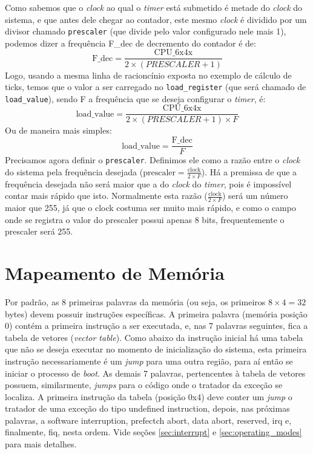 Como sabemos que o \emph{clock} ao qual o \emph{timer} está submetido é metade do \emph{clock} do sistema, e que antes dele chegar ao contador, este mesmo \emph{clock} é dividido por um divisor chamado \verb+prescaler+ (que divide pelo valor configurado nele mais 1), podemos dizer a frequência F\_dec de decremento do contador é de:
\begin{equation}
	\text{F\_dec} = \frac{\text{CPU\_6x4x}}{2 \times (PRESCALER+1)}
\end{equation}
Logo, usando a mesma linha de racioncínio exposta no exemplo de cálculo de ticks, temos que o valor a ser carregado no \verb+load_register+ (que será chamado de \verb+load_value+), sendo F a frequência que se deseja configurar o \emph{timer}, é:
\begin{equation}
	\text{load\_value} = \frac{\text{CPU\_6x4x}}{2 \times (PRESCALER+1) \times F}
\end{equation}
Ou de maneira mais simples:
\begin{equation}
	\text{load\_value} = \frac{\text{F\_dec}}{F}
\end{equation}
Precisamos agora definir o \verb+prescaler+. Definimos ele como a razão entre o \emph{clock} do sistema pela frequência desejada ($\text{prescaler}=\frac{\text{clock}}{2 \times F}$). Há a premissa de que a frequência desejada não será maior que a do \emph{clock} do \emph{timer}, pois é impossível contar mais rápido que isto. Normalmente esta razão ($\frac{\text{clock}}{2 \times F}$) será um número maior que 255, já que o clock costuma ser muito mais rápido, e como o campo onde se registra o valor do prescaler possui apenas 8 bits, frequentemente o prescaler será 255.


\section{Mapeamento de Memória}
\label{sec:map}

Por padrão, as 8 primeiras palavras da memória (ou seja, os primeiros $8 \times 4 = 32$ bytes) devem possuir instruções específicas. A primeira palavra (memória posição 0) contém a primeira instrução a ser executada, e, nas 7 palavras seguintes, fica a tabela de vetores (\emph{vector table}). Como abaixo da instrução inicial há uma tabela que não se deseja executar no momento de inicialização do sistema, esta primeira instrução necessariamente é um \emph{jump} para uma outra região, para aí então se iniciar o processo de \emph{boot}. 
As demais 7 palavras, pertencentes à tabela de vetores possuem, similarmente, \emph{jumps} para o código onde o tratador da exceção se localiza. A primeira instrução da tabela (posição 0x4) deve conter um \emph{jump} o tratador de uma exceção do tipo undefined instruction, depois, nas próximas palavras, a software interruption, prefectch abort, data abort, reserved, irq e, finalmente, fiq, nesta ordem. Vide seções \ref{sec:interrupt} e \ref{sec:operating_modes} para mais detalhes.


